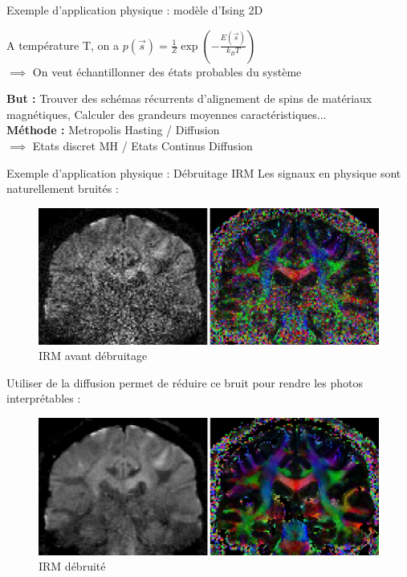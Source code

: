 \documentclass{beamer}
\begin{document}
        
        \begin{frame}{Exemple d'application physique : modèle d'Ising 2D}
        
        A température T, on a $p(\Vec{s}) = \frac{1}{Z} \exp\left(-\frac{E(\Vec{s})}{k_B T}\right)$ \\
        $\implies$ On veut échantillonner des états probables du système \\
        \vspace{0.8cm}
        
        \textbf{But :} Trouver des schémas récurrents d'alignement de spins de matériaux magnétiques, Calculer des grandeurs moyennes caractéristiques... \\
        \vspace{0.8cm}
        \textbf{Méthode :} Metropolis Hasting / Diffusion \\
        $\implies$ Etats discret MH / Etats Continus Diffusion
	\end{frame}

        \begin{frame}{Exemple d'application physique : Débruitage IRM}
        \small Les signaux en physique sont naturellement bruités :
        \begin{figure}
            \centering
            \includegraphics[width=0.46\linewidth]{IRM_bruite.png}
            \caption{IRM avant débruitage}
        \end{figure}
        
        \small Utiliser de la diffusion permet de réduire ce bruit pour rendre les photos interprétables :
        \begin{figure}
            \centering
            \includegraphics[width=0.46\linewidth]{IRM_debruite.png}
            \caption{IRM débruité}
            \label{fig:enter-label}
        \end{figure}
        \end{frame}
	
\end{document}
